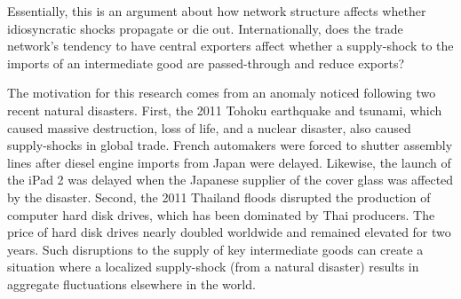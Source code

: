\documentclass[10pt,letterpaper]{article}
\begin{document}
Essentially, this is an argument about how network structure affects whether idiosyncratic shocks propagate or die out. Internationally, does the trade network's tendency to have central exporters affect whether a supply-shock to the imports of an intermediate good are passed-through and reduce exports?

The motivation for this research comes from an anomaly noticed following two recent natural disasters. First, the 2011 Tohoku earthquake and tsunami, which caused massive destruction, loss of life, and a nuclear disaster, also caused supply-shocks in global trade. French automakers were forced to shutter assembly lines after diesel engine imports from Japan were delayed. Likewise, the launch of the iPad 2 was delayed when the Japanese supplier of the cover glass was affected by the disaster. Second, the 2011 Thailand floods disrupted the production of computer hard disk drives, which has been dominated by Thai producers. The price of hard disk drives nearly doubled worldwide and remained elevated for two years. Such disruptions to the supply of key intermediate goods can create a situation where a localized supply-shock (from a natural disaster) results in aggregate fluctuations elsewhere in the world.
\end{document}
